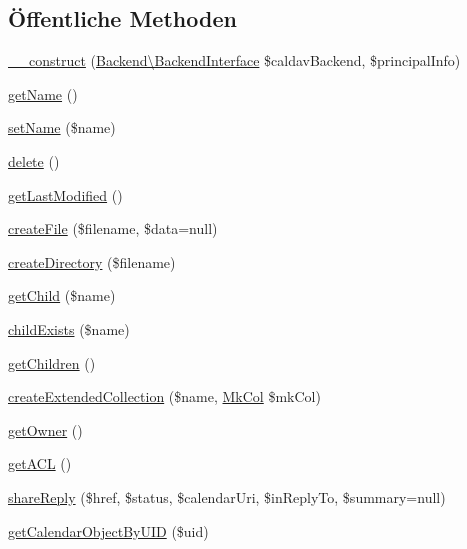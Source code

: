 \subsection*{Öffentliche Methoden}
\begin{DoxyCompactItemize}
\item 
\mbox{\hyperlink{class_sabre_1_1_cal_d_a_v_1_1_calendar_home_a4bba4cdd953eca315348e829e5bb34d8}{\+\_\+\+\_\+construct}} (\mbox{\hyperlink{interface_sabre_1_1_cal_d_a_v_1_1_backend_1_1_backend_interface}{Backend\textbackslash{}\+Backend\+Interface}} \$caldav\+Backend, \$principal\+Info)
\item 
\mbox{\hyperlink{class_sabre_1_1_cal_d_a_v_1_1_calendar_home_a045f3f5d909aaea952bc04b440a88493}{get\+Name}} ()
\item 
\mbox{\hyperlink{class_sabre_1_1_cal_d_a_v_1_1_calendar_home_aaa0c4f3c31b554595466644949399be0}{set\+Name}} (\$name)
\item 
\mbox{\hyperlink{class_sabre_1_1_cal_d_a_v_1_1_calendar_home_aab715d722e415d5d9621b414b6045060}{delete}} ()
\item 
\mbox{\hyperlink{class_sabre_1_1_cal_d_a_v_1_1_calendar_home_a0dfbe0749f15d71d6596e83aa49fc776}{get\+Last\+Modified}} ()
\item 
\mbox{\hyperlink{class_sabre_1_1_cal_d_a_v_1_1_calendar_home_a093e54517bdfc3d347aafa746d03e4dc}{create\+File}} (\$filename, \$data=null)
\item 
\mbox{\hyperlink{class_sabre_1_1_cal_d_a_v_1_1_calendar_home_af17460f3f37b15f588e86d24a2c83d07}{create\+Directory}} (\$filename)
\item 
\mbox{\hyperlink{class_sabre_1_1_cal_d_a_v_1_1_calendar_home_a3bec69b865192277e087af7d3ec9da46}{get\+Child}} (\$name)
\item 
\mbox{\hyperlink{class_sabre_1_1_cal_d_a_v_1_1_calendar_home_a2798ea68cdc85f2273a5fe800b9693c5}{child\+Exists}} (\$name)
\item 
\mbox{\hyperlink{class_sabre_1_1_cal_d_a_v_1_1_calendar_home_aa97108e2047c34a8d17ee6bbac1f4e67}{get\+Children}} ()
\item 
\mbox{\hyperlink{class_sabre_1_1_cal_d_a_v_1_1_calendar_home_a46df8b46b7364cd83b077a7863d7caa7}{create\+Extended\+Collection}} (\$name, \mbox{\hyperlink{class_sabre_1_1_d_a_v_1_1_mk_col}{Mk\+Col}} \$mk\+Col)
\item 
\mbox{\hyperlink{class_sabre_1_1_cal_d_a_v_1_1_calendar_home_aea7f05be2069407a39e6ec0cf444f6d9}{get\+Owner}} ()
\item 
\mbox{\hyperlink{class_sabre_1_1_cal_d_a_v_1_1_calendar_home_ae0d277110da1fcc90378591dbde19b82}{get\+A\+CL}} ()
\item 
\mbox{\hyperlink{class_sabre_1_1_cal_d_a_v_1_1_calendar_home_a69b87a64e627728c1e7e3fcf478c962c}{share\+Reply}} (\$href, \$status, \$calendar\+Uri, \$in\+Reply\+To, \$summary=null)
\item 
\mbox{\hyperlink{class_sabre_1_1_cal_d_a_v_1_1_calendar_home_a51af634cae3520b0c0169bd273dae32e}{get\+Calendar\+Object\+By\+U\+ID}} (\$uid)
\end{DoxyCompactItemize}
